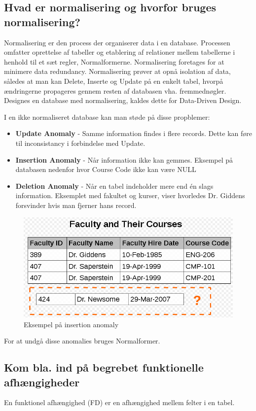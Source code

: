\newpage

\subsection{Hvad er normalisering og hvorfor bruges normalisering?}\label{sec:normal}
Normalisering er den process der organiserer data i en database. Processen omfatter oprettelse af tabeller og etablering af relationer mellem tabellerne i henhold til et sæt regler, Normalformerne. Normalisering foretages for at minimere data redundancy. Normalisering prøver at opnå isolation af data, således at man kan Delete, Inserte og Update på en enkelt tabel, hvorpå ændringerne propageres gennem resten af databasen vha. fremmednøgler. Designes en database med normalisering, kaldes dette for Data-Driven Design.

I en ikke normaliseret database kan man støde på disse propblemer:

\begin{itemize}
	\item \textbf{Update Anomaly} - Samme information findes i flere records. Dette kan føre til inconsistancy i forbindelse med Update.
	\item \textbf{Insertion Anomaly} - Når information ikke kan gemmes. Eksempel på databasen nedenfor hvor Course Code ikke kan være NULL
	\item \textbf{Deletion Anomaly} - Når en tabel indeholder mere end én slags information. Eksemplet med fakultet og kurser, viser hvorledes Dr. Giddens forsvinder hvis man fjerner hans record.	
\end{itemize}

\begin{figure}[H]
	\centering
	\includegraphics[width=0.7\linewidth]{figs/spm5/insertionAnomaly.PNG}
	\caption{Eksempel på insertion anomaly}
	\label{fig:insertionAnomaly}
\end{figure}

For at undgå disse anomalies bruges Normalformer.

\subsection{Kom bla. ind på begrebet funktionelle afhængigheder}
En funktionel afhængighed (FD) er en afhængighed mellem felter i en tabel.



